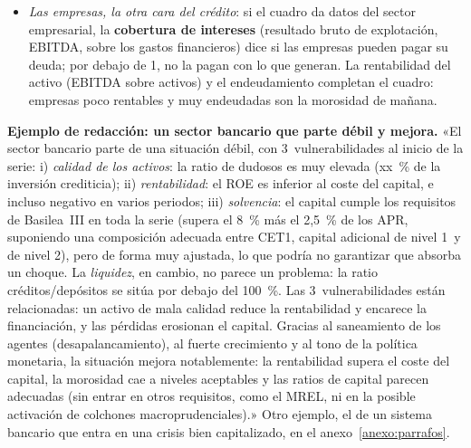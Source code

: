 \documentclass[11pt]{article}
\begin{document}
\begin{itemize}
\item \emph{Las empresas, la otra cara del crédito}: si el cuadro da datos del sector empresarial, la \textbf{cobertura de intereses} (resultado bruto de explotación, EBITDA, sobre los gastos financieros) dice si las empresas pueden pagar su deuda; por debajo de 1, no la pagan con lo que generan. La rentabilidad del activo (EBITDA sobre activos) y el endeudamiento completan el cuadro: empresas poco rentables y muy endeudadas son la morosidad de mañana.
\end{itemize}

\begin{infografia}[!htb]
\centering
\caption{Semáforo de la banca: referencias de las ratios principales}\label{figu:esquema-semaforo}
\end{infografia}

\begin{anotaciones}
\textbf{Ejemplo de redacción: un sector bancario que parte débil y mejora.}
«El sector bancario parte de una situación débil, con 3~vulnerabilidades al inicio de la serie: i) \emph{calidad de los activos}: la ratio de dudosos es muy elevada (xx~\% de la inversión crediticia); ii) \emph{rentabilidad}: el ROE es inferior al coste del capital, e incluso negativo en varios periodos; iii) \emph{solvencia}: el capital cumple los requisitos de Basilea~III en toda la serie (supera el 8~\% más el 2,5~\% de los APR, suponiendo una composición adecuada entre CET1, capital adicional de nivel 1~y de nivel 2), pero de forma muy ajustada, lo que podría no garantizar que absorba un choque. La \emph{liquidez}, en cambio, no parece un problema: la ratio créditos/depósitos se sitúa por debajo del 100~\%. Las 3~vulnerabilidades están relacionadas: un activo de mala calidad reduce la rentabilidad y encarece la financiación, y las pérdidas erosionan el capital. Gracias al saneamiento de los agentes (desapalancamiento), al fuerte crecimiento y al tono de la política monetaria, la situación mejora notablemente: la rentabilidad supera el coste del capital, la morosidad cae a niveles aceptables y las ratios de capital parecen adecuadas (sin entrar en otros requisitos, como el MREL, ni en la posible activación de colchones macroprudenciales).» Otro ejemplo, el de un sistema bancario que entra en una crisis bien capitalizado, en el anexo~\ref{anexo:parrafos}.

\end{anotaciones}
\end{document}
